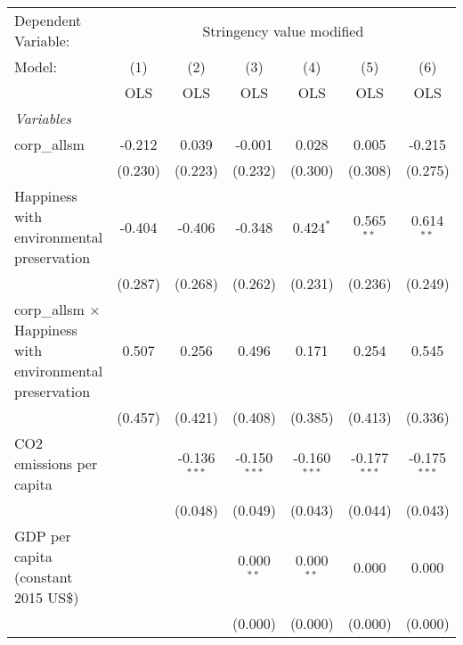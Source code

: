 
\begingroup
\centering
\begin{tabular}{lcccccc}
   \toprule
   Dependent Variable: & \multicolumn{6}{c}{Stringency value modified}\\
   Model:                                                           & (1)     & (2)            & (3)            & (4)            & (5)            & (6)\\  
                                                                    &  OLS    & OLS            & OLS            & OLS            & OLS            & OLS\\  
   \midrule
   \emph{Variables}\\
   corp\_allsm                                                      & -0.212  & 0.039          & -0.001         & 0.028          & 0.005          & -0.215\\   
                                                                    & (0.230) & (0.223)        & (0.232)        & (0.300)        & (0.308)        & (0.275)\\   
   Happiness with environmental preservation                        & -0.404  & -0.406         & -0.348         & 0.424$^{*}$    & 0.565$^{**}$   & 0.614$^{**}$\\   
                                                                    & (0.287) & (0.268)        & (0.262)        & (0.231)        & (0.236)        & (0.249)\\   
   corp\_allsm $\times$ Happiness with environmental preservation   & 0.507   & 0.256          & 0.496          & 0.171          & 0.254          & 0.545\\   
                                                                    & (0.457) & (0.421)        & (0.408)        & (0.385)        & (0.413)        & (0.336)\\   
   CO2 emissions per capita                                         &         & -0.136$^{***}$ & -0.150$^{***}$ & -0.160$^{***}$ & -0.177$^{***}$ & -0.175$^{***}$\\   
                                                                    &         & (0.048)        & (0.049)        & (0.043)        & (0.044)        & (0.043)\\   
   GDP per capita (constant 2015 US\$)                              &         &                & 0.000$^{**}$   & 0.000$^{**}$   & 0.000          & 0.000\\   
                                                                    &         &                & (0.000)        & (0.000)        & (0.000)        & (0.000)\\   

\end{tabular}
